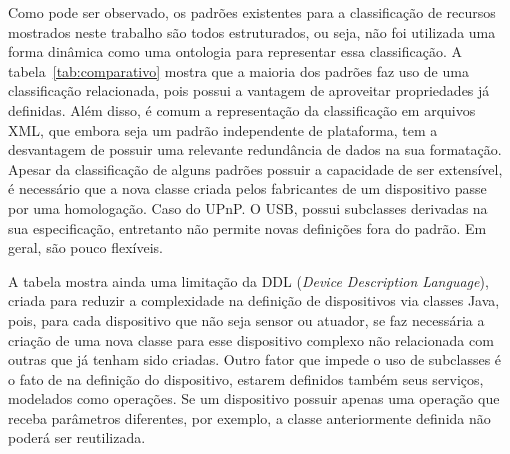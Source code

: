 Como pode ser observado, os padrões existentes para a classificação de recursos mostrados neste trabalho são todos estruturados, ou seja, não foi utilizada uma forma dinâmica como uma ontologia para representar essa classificação. A tabela~\ref{tab:comparativo} mostra que a maioria dos padrões faz uso de uma classificação relacionada, pois possui a vantagem de aproveitar propriedades já definidas. Além disso, é comum a representação da classificação em arquivos XML, que embora seja um padrão independente de plataforma, tem a desvantagem de possuir uma relevante redundância de dados na sua formatação. Apesar da classificação de alguns padrões possuir a capacidade de ser extensível, é necessário que a nova classe criada pelos fabricantes de um dispositivo passe por uma homologação. Caso do UPnP. O USB, possui subclasses derivadas na sua especificação, entretanto não permite novas definições fora do padrão. Em geral, são pouco flexíveis. 

A tabela mostra ainda uma limitação da DDL (\emph{Device Description Language}), criada para reduzir a complexidade na definição de dispositivos via classes Java, pois, para cada dispositivo que não seja sensor ou atuador, se faz necessária a criação de uma nova classe para esse dispositivo complexo não relacionada com outras que já tenham sido criadas. Outro fator que impede o uso de subclasses é o fato de na definição do dispositivo, estarem definidos também seus serviços, modelados como operações. Se um dispositivo possuir apenas uma operação que receba parâmetros diferentes, por exemplo, a classe anteriormente definida não poderá ser reutilizada. 

